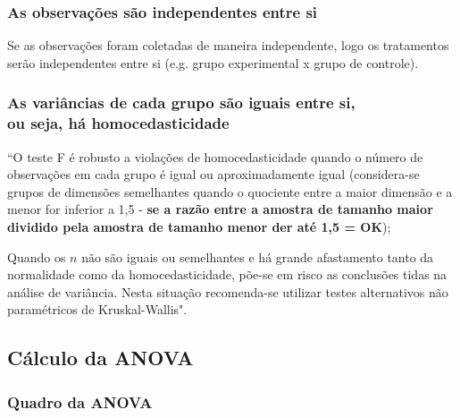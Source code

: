 			\subsubsection{As observações são independentes entre si}
				Se as observações foram coletadas de maneira independente, logo os tratamentos serão independentes entre si (e.g. grupo experimental x grupo de controle).			
			
			\subsubsection{As variâncias de cada grupo são iguais entre si, \\ ou seja, há homocedasticidade}
			
				``O teste F é robusto a violações de homocedasticidade quando o número de observações em cada grupo é igual ou aproximadamente igual (considera-se grupos de dimensões semelhantes quando o quociente entre a maior dimensão e a menor for inferior a 1,5 - \textbf{se a razão entre a amostra de tamanho maior dividido pela amostra de tamanho menor der até 1,5 = OK});

				Quando os $ n $ não são iguais ou semelhantes e há grande afastamento tanto da normalidade como da homocedasticidade, põe-se em risco as conclusões tidas na análise de variância. Nesta situação recomenda-se utilizar testes alternativos não paramétricos de Kruskal-Wallis".

	\subsection{Cálculo da ANOVA}

		\subsubsection{Quadro da ANOVA}

